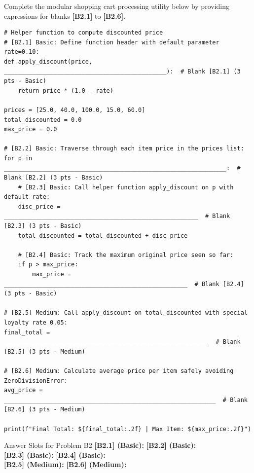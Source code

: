 \documentclass[11pt,a4paper]{article}
\begin{document}
Complete the modular shopping cart processing utility below by providing expressions for blanks \textbf{[B2.1]} to \textbf{[B2.6]}.

\begin{lstlisting}
# Helper function to compute discounted price
# [B2.1] Basic: Define function header with default parameter rate=0.10:
def apply_discount(price, ______________________________________________):  # Blank [B2.1] (3 pts - Basic)
    return price * (1.0 - rate)

prices = [25.0, 40.0, 100.0, 15.0, 60.0]
total_discounted = 0.0
max_price = 0.0

# [B2.2] Basic: Traverse through each item price in the prices list:
for p in _______________________________________________________________:  # Blank [B2.2] (3 pts - Basic)
    # [B2.3] Basic: Call helper function apply_discount on p with default rate:
    disc_price = _______________________________________________________  # Blank [B2.3] (3 pts - Basic)
    total_discounted = total_discounted + disc_price
    
    # [B2.4] Basic: Track the maximum original price seen so far:
    if p > max_price:
        max_price = ____________________________________________________  # Blank [B2.4] (3 pts - Basic)

# [B2.5] Medium: Call apply_discount on total_discounted with special loyalty rate 0.05:
final_total = __________________________________________________________  # Blank [B2.5] (3 pts - Medium)

# [B2.6] Medium: Calculate average price per item safely avoiding ZeroDivisionError:
avg_price = ____________________________________________________________  # Blank [B2.6] (3 pts - Medium)

print(f"Final Total: ${final_total:.2f} | Max Item: ${max_price:.2f}")
\end{lstlisting}

\vspace{0.4mm}
\begin{answerbox}[height=1.8cm]{Answer Slots for Problem B2}
\textbf{[B2.1] (Basic):} \dotfill \quad \textbf{[B2.2] (Basic):} \dotfill\\[1.1mm]
\textbf{[B2.3] (Basic):} \dotfill \quad \textbf{[B2.4] (Basic):} \dotfill\\[1.1mm]
\textbf{[B2.5] (Medium):} \dotfill \quad \textbf{[B2.6] (Medium):} \dotfill
\end{answerbox}

\vspace{0.6mm}
\end{document}
